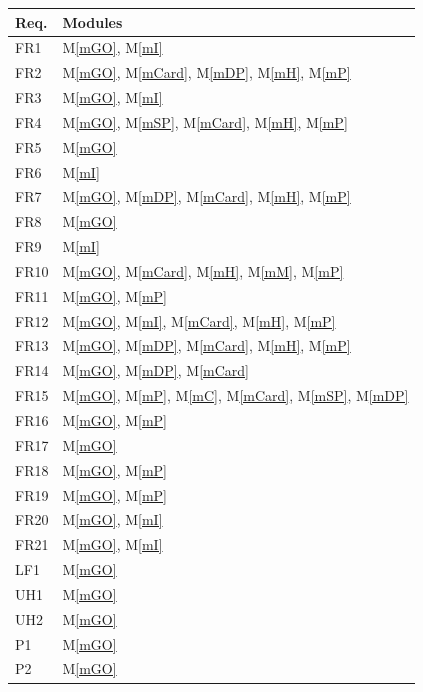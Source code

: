 \documentclass[12pt, titlepage]{article}
\newcommand{\mref}[1]{M\ref{#1}}
\begin{document}
\begin{table}[H]
    \centering
    \begin{tabular}{p{} p{}}
        \toprule
        \textbf{Req.} & \textbf{Modules}\\
        \midrule
        FR1 & \mref{mGO}, \mref{mI} \\
        FR2 & \mref{mGO}, \mref{mCard}, \mref{mDP}, \mref{mH}, \mref{mP} \\
        FR3 & \mref{mGO}, \mref{mI} \\
        FR4 & \mref{mGO}, \mref{mSP}, \mref{mCard}, \mref{mH}, \mref{mP} \\
        FR5 & \mref{mGO} \\
        FR6 & \mref{mI} \\
        FR7 & \mref{mGO}, \mref{mDP}, \mref{mCard}, \mref{mH}, \mref{mP} \\
        FR8 & \mref{mGO} \\
        FR9 & \mref{mI} \\
        FR10 & \mref{mGO}, \mref{mCard}, \mref{mH}, \mref{mM}, \mref{mP} \\
        FR11 & \mref{mGO}, \mref{mP} \\
        FR12 & \mref{mGO}, \mref{mI}, \mref{mCard}, \mref{mH}, \mref{mP} \\
        FR13 & \mref{mGO}, \mref{mDP}, \mref{mCard}, \mref{mH}, \mref{mP} \\
        FR14 & \mref{mGO}, \mref{mDP}, \mref{mCard} \\
        FR15 & \mref{mGO}, \mref{mP}, \mref{mC}, \mref{mCard}, \mref{mSP}, \mref{mDP} \\
        FR16 & \mref{mGO}, \mref{mP} \\
        FR17 & \mref{mGO} \\
        FR18 & \mref{mGO}, \mref{mP} \\
        FR19 & \mref{mGO}, \mref{mP} \\
        FR20 & \mref{mGO}, \mref{mI} \\
        FR21 & \mref{mGO}, \mref{mI} \\
        LF1 & \mref{mGO} \\
        UH1 & \mref{mGO} \\
        UH2 & \mref{mGO} \\
        P1 & \mref{mGO} \\
        P2 & \mref{mGO} \\

\end{tabular}
\end{table}
\end{document}
